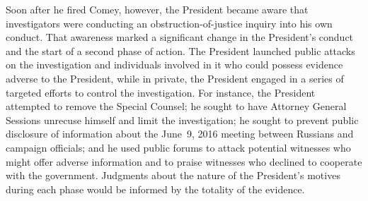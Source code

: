 Soon after he fired Comey, however, the President became aware that investigators were conducting an obstruction-of-justice inquiry into his own conduct.
That awareness marked a significant change in the President's conduct and the start of a second phase of action.
The President launched public attacks on the investigation and individuals involved in it who could possess evidence adverse to the President, while in private, the President engaged in a series of targeted efforts to control the investigation.
For instance, the President attempted to remove the Special Counsel; he sought to have Attorney General Sessions unrecuse himself and limit the investigation; he sought to prevent public disclosure of information about the June~9, 2016 meeting between Russians and campaign officials; and he used public forums to attack potential witnesses who might offer adverse information and to praise witnesses who declined to cooperate with the government.
Judgments about the nature of the President's motives during each phase would be informed by the totality of the evidence.
